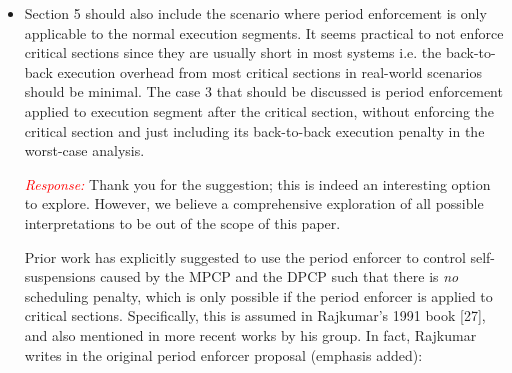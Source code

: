 \documentclass[12pt]{article}
\newenvironment{response}[0]{\textcolor{red}{\emph{Response: }}\color{blue}}{\medskip}
\newcommand{\action}[1]{\textcolor{red}{\emph{\it Actions taken: }}{\color{blue}#1}\medskip}
\begin{document}
\begin{itemize}
\begin{response}
We need the analysis from Nelissen et al.\ to precisely break a self-suspending task into multiple deferrable subtasks so that we can calculate the worst-case release jitter of a computation segment. Section 4 explains why it is difficult to precisely calculate the release jitter of the computation segments and clearly points out the connection to Nelissen et al.'s analysis.

\end{response}

\action{In the revision, we completely rewrote Section 4 to explain the gap between the segmented self-suspending task model and the corresponding deferrable sporadic task set, and to precisely state the equivalence of the conversion to the worst-case response-time analysis of individual computation segments (i.e., Nelissen et al.'s analysis).
}

	\item 
Section 5 should also include the scenario where period enforcement is only
applicable to the normal execution segments. It seems practical to not
enforce critical sections since they are usually short in most systems i.e.
the back-to-back execution overhead from most critical sections in
real-world scenarios should be minimal. The case 3 that should be discussed
is period enforcement applied to execution segment after the critical
section, without enforcing the critical section and just including its
back-to-back execution penalty in the worst-case analysis.


\begin{response}
Thank you for the suggestion; this is indeed an interesting option to explore. However, we believe a comprehensive exploration of all possible interpretations to be out of the scope of this paper. 

Prior work has explicitly suggested to use the period enforcer to control self-suspensions caused by the MPCP and the DPCP such that there is \emph{no} scheduling penalty, which is only possible if the period enforcer is applied to critical sections. Specifically, this is assumed in Rajkumar's 1991 book [27], and also mentioned in more recent works by his group. In fact, Rajkumar writes in the original period enforcer proposal (emphasis added):


\end{response}
\end{itemize}
\end{document}
